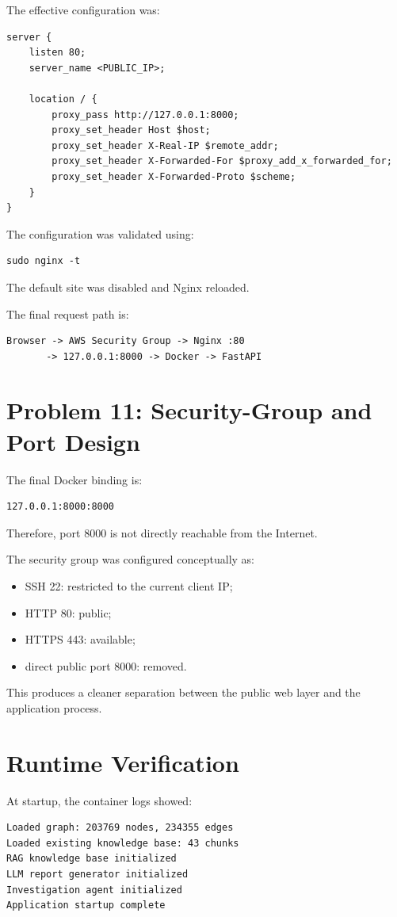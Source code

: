 \documentclass[11pt,a4paper]{article}
\begin{document}
The effective configuration was:
\begin{lstlisting}
server {
    listen 80;
    server_name <PUBLIC_IP>;

    location / {
        proxy_pass http://127.0.0.1:8000;
        proxy_set_header Host $host;
        proxy_set_header X-Real-IP $remote_addr;
        proxy_set_header X-Forwarded-For $proxy_add_x_forwarded_for;
        proxy_set_header X-Forwarded-Proto $scheme;
    }
}
\end{lstlisting}

The configuration was validated using:
\begin{lstlisting}
sudo nginx -t
\end{lstlisting}

The default site was disabled and Nginx reloaded.

The final request path is:
\begin{verbatim}
Browser -> AWS Security Group -> Nginx :80
       -> 127.0.0.1:8000 -> Docker -> FastAPI
\end{verbatim}

\section{Problem 11: Security-Group and Port Design}
The final Docker binding is:
\begin{lstlisting}
127.0.0.1:8000:8000
\end{lstlisting}

Therefore, port 8000 is not directly reachable from the Internet.

The security group was configured conceptually as:
\begin{itemize}
\item SSH 22: restricted to the current client IP;
\item HTTP 80: public;
\item HTTPS 443: available;
\item direct public port 8000: removed.
\end{itemize}

This produces a cleaner separation between the public web layer and the application process.

\section{Runtime Verification}
At startup, the container logs showed:
\begin{lstlisting}
Loaded graph: 203769 nodes, 234355 edges
Loaded existing knowledge base: 43 chunks
RAG knowledge base initialized
LLM report generator initialized
Investigation agent initialized
Application startup complete
\end{lstlisting}
\end{document}
